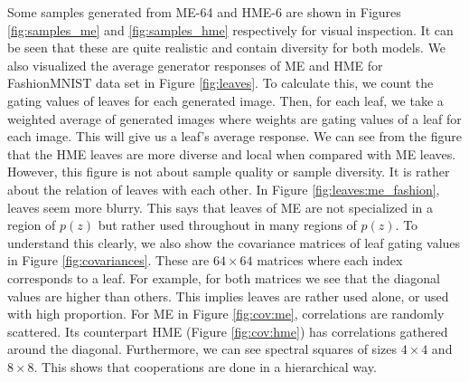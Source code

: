 \documentclass[a4paper,onesided,12pt]{report}
\begin{document}
Some samples generated from ME-64 and HME-6 are shown in Figures \ref{fig:samples_me} and \ref{fig:samples_hme} respectively for visual inspection. It can be seen that these are quite realistic and contain diversity for both models. We also visualized the average generator responses of ME and HME for FashionMNIST data set in Figure \ref{fig:leaves}. To calculate this, we count the gating values of leaves for each generated image. Then, for each leaf, we take a weighted average of generated images where weights are gating values of a leaf for each image. This will give us a leaf's average response. We can see from the figure that the HME leaves are more diverse and local when compared with ME leaves. However, this figure is not about sample quality or sample diversity. It is rather about the relation of leaves with each other. In Figure \ref{fig:leaves:me_fashion}, leaves seem more blurry. This says that leaves of ME are not specialized in a region of $p(z)$ but rather used throughout in many regions of $p(z)$. To understand this clearly, we also show the covariance matrices of leaf gating values in Figure \ref{fig:covariances}. These are $64 \times 64$ matrices where each index corresponds to a leaf. For example, for both matrices we see that the diagonal values are higher than others. This implies leaves are rather used alone, or used with high proportion. For ME in Figure \ref{fig:cov:me}, correlations are randomly scattered. Its counterpart HME (Figure \ref{fig:cov:hme}) has correlations gathered around the diagonal. Furthermore, we can see spectral squares of sizes $4 \times 4$ and $8 \times 8$. This shows that cooperations are done in a hierarchical way.
\end{document}
